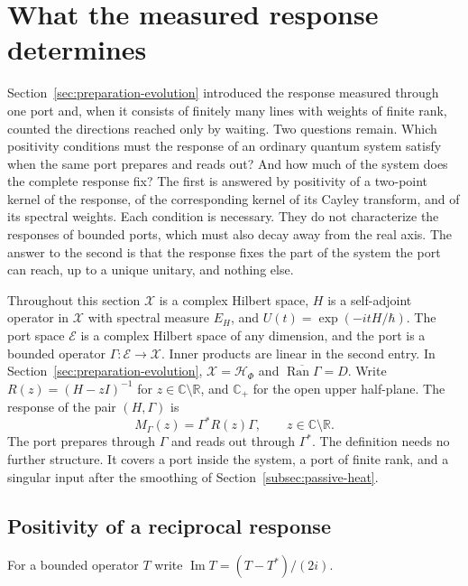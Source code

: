 \documentclass[11pt]{article}
\theoremstyle{definition}
\DeclareMathOperator{\Ran}{Ran}
\newcommand{\C}{\mathbb C}
\newcommand{\R}{\mathbb R}
\begin{document}
\section{What the measured response determines}
\label{sec:passive-response}

Section~\ref{sec:preparation-evolution} introduced the response measured through one port and, when it consists of finitely many lines with weights of finite rank, counted the directions reached only by waiting. Two questions remain. Which positivity conditions must the response of an ordinary quantum system satisfy when the same port prepares and reads out? And how much of the system does the complete response fix? The first is answered by positivity of a two-point kernel of the response, of the corresponding kernel of its Cayley transform, and of its spectral weights. Each condition is necessary. They do not characterize the responses of bounded ports, which must also decay away from the real axis. The answer to the second is that the response fixes the part of the system the port can reach, up to a unique unitary, and nothing else.

Throughout this section $\mathcal X$ is a complex Hilbert space, $H$ is a self-adjoint operator in $\mathcal X$ with spectral measure $E_H$, and $U(t)=\exp(-itH/\hbar)$. The port space $\mathcal E$ is a complex Hilbert space of any dimension, and the port is a bounded operator $\Gamma:\mathcal E\to\mathcal X$. Inner products are linear in the second entry. In Section~\ref{sec:preparation-evolution}, $\mathcal X=\mathcal H_\Phi$ and $\overline{\Ran\Gamma}=D$. Write $R(z)=(H-zI)^{-1}$ for $z\in\C\setminus\R$, and $\C_+$ for the open upper half-plane. The response of the pair $(H,\Gamma)$ is
\begin{equation}
 M_\Gamma(z)=\Gamma^*R(z)\Gamma,\qquad z\in\C\setminus\R .
 \label{eq:passive-response}
\end{equation}
The port prepares through $\Gamma$ and reads out through $\Gamma^*$. The definition needs no further structure. It covers a port inside the system, a port of finite rank, and a singular input after the smoothing of Section~\ref{subsec:passive-heat}.

\subsection{Positivity of a reciprocal response}
\label{subsec:passive-positivity}

For a bounded operator $T$ write $\operatorname{Im}T=(T-T^*)/(2i)$.
\end{document}
